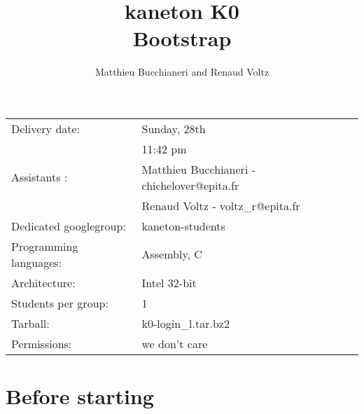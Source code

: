 
%
%


\usepackage{pdfpages}

%
%


%
%

\title{kaneton K0\\Bootstrap}

%
%

\author{\small{Matthieu Bucchianeri} and
        \small{Renaud Voltz}}

%
%



\maketitle

\vspace{5mm}

\begin{tabular}{p{7cm}l}
Delivery date: & Sunday, 28th \\
               & 11:42 pm \\
Assistants : & Matthieu Bucchianeri - \small{chichelover@epita.fr} \\
             & Renaud Voltz - \small{voltz\_r@epita.fr} \\
Dedicated googlegroup: & kaneton-students \\
Programming languages: & Assembly, C \\
Architecture: & Intel 32-bit \\
Students per group: & 1\\
Tarball: & k0-login\_l.tar.bz2\\
Permissions: & we don't care
\end{tabular}


\section*{Before starting}

